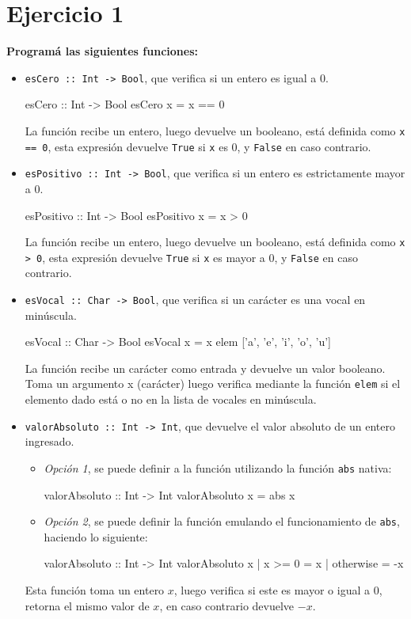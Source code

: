 \documentclass{article}
\begin{document}
\section*{Ejercicio 1}
\textbf{Programá las siguientes funciones:}

\begin{itemize}
    \item 
\verb|esCero :: Int -> Bool|, que verifica si un entero es igual a $0$.
\begin{haskell}
esCero :: Int -> Bool
esCero x = x == 0
\end{haskell}
La función recibe un entero, luego devuelve un booleano, está definida como \verb|x == 0|, esta expresión devuelve \verb|True| si \verb|x| es $0$, y \verb|False| en caso contrario.
    \item 
\verb|esPositivo :: Int -> Bool|, que verifica si un entero es estrictamente mayor a $0$.
\begin{haskell}
esPositivo :: Int -> Bool
esPositivo x = x > 0
\end{haskell}    
La función recibe un entero, luego devuelve un booleano, está definida como \verb|x > 0|, esta expresión devuelve \verb|True| si \verb|x| es mayor a $0$, y \verb|False| en caso contrario.
    \item 
\verb|esVocal :: Char -> Bool|, que verifica si un carácter es una vocal en minúscula.
\begin{haskell}
esVocal :: Char -> Bool
esVocal x = x elem ['a', 'e', 'i', 'o', 'u']
\end{haskell}    
La función recibe un carácter como entrada y devuelve un valor booleano. Toma un argumento x (carácter) luego verifica mediante la función \verb|elem| si el elemento dado está o no en la lista de vocales en minúscula.
    \item 
\verb|valorAbsoluto :: Int -> Int|, que devuelve el valor absoluto de un entero ingresado.
\begin{itemize}
    \item 
    \emph{Opción 1}, se puede definir a la función utilizando la función \verb|abs| nativa:
    \begin{haskell}
    valorAbsoluto :: Int -> Int
    valorAbsoluto x = abs x
    \end{haskell}
    \item 
    \emph{Opción 2}, se puede definir la función emulando el funcionamiento de \verb|abs|, haciendo lo siguiente:
    \begin{haskell}
    valorAbsoluto :: Int -> Int
    valorAbsoluto x | x >= 0 = x
                    | otherwise = -x
    \end{haskell} 
\end{itemize}
Esta función toma un entero $x$, luego verifica si este es mayor o igual a $0$, retorna el mismo valor de $x$, en caso contrario devuelve $-x$.
\end{itemize}
\end{document}
